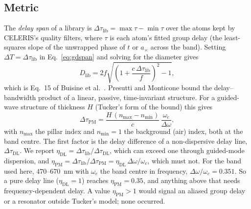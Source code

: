 \documentclass[preprint,12pt]{elsarticle}
\begin{document}
\subsection{Metric}
The \emph{delay span} of a library is $\Delta\tau_\mathrm{lib}=\max\tau-\min\tau$ over
the atoms kept by CELERIS's quality filters, where $\tau$ is each atom's fitted group
delay (the least-squares slope of the unwrapped phase of $t$ or $a_\times$ across the
band). Setting $\Delta T=\Delta\tau_\mathrm{lib}$ in Eq.~\eqref{eq:gdspan} and solving
for the diameter gives
\begin{equation}
D_\mathrm{lib} = 2f\sqrt{\left(1+\frac{c\,\Delta\tau_\mathrm{lib}}{f}\right)^2-1},
\label{eq:dlib}
\end{equation}
which is Eq.~15 of Buisine et al.~\cite{buisine2026}. Presutti and Monticone bound the
delay--bandwidth product of a linear, passive, time-invariant structure. For a
guided-wave structure of thickness $H$ (Tucker's form of the bound) this gives
\begin{equation}
\Delta\tau_\mathrm{PM} = \frac{H\,(n_\mathrm{max}-n_\mathrm{min})}{c}\,
\frac{\omega_c}{\Delta\omega},
\label{eq:pm}
\end{equation}
with $n_\mathrm{max}$ the pillar index and $n_\mathrm{min}=1$ the background (air) index,
both at the band centre. The first factor is the delay difference of a
non-dispersive delay line, $\Delta\tau_\mathrm{DL}$. We report
$\eta_\mathrm{DL}=\Delta\tau_\mathrm{lib}/\Delta\tau_\mathrm{DL}$, which can exceed one
through guided-mode dispersion, and
$\eta_\mathrm{PM}=\Delta\tau_\mathrm{lib}/\Delta\tau_\mathrm{PM}
=\eta_\mathrm{DL}\,\Delta\omega/\omega_c$, which must not. For the band used here,
$470$--$670$~nm with $\omega_c$ the band centre in frequency, $\Delta\omega/\omega_c=0.351$.
So a pure delay line ($\eta_\mathrm{DL}=1$) reaches $\eta_\mathrm{PM}=0.35$, and anything
above that needs frequency-dependent delay. A value $\eta_\mathrm{PM}>1$ would signal an
aliased group delay or a resonator outside Tucker's model; none occurred.
\end{document}
